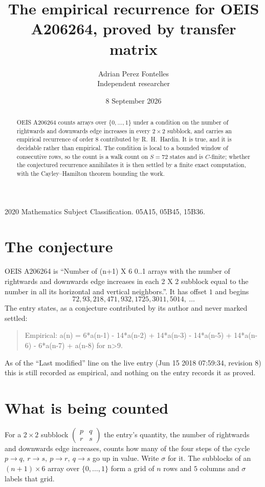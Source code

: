 \documentclass[11pt,a4paper]{article}
\title{The empirical recurrence for OEIS A206264, proved by transfer matrix}
\author{Adrian Perez Fontelles\\ \small Independent researcher}
\date{8 September 2026}
\theoremstyle{plain}
\theoremstyle{definition}
\begin{document}
\maketitle

\begin{abstract}
OEIS A206264 counts arrays over $\{0,\dots,1\}$ under a condition on the number of rightwards and downwards edge increases
in every $2\times2$ subblock, and carries an empirical recurrence of order $8$ contributed by
R.~H.~Hardin. It is true, and it is decidable rather than empirical. The condition is local to
a bounded window of consecutive rows, so the count is a walk count on $S=72$ states and is
$C$-finite; whether the conjectured recurrence annihilates it is then settled by a finite exact
computation, with the Cayley--Hamilton theorem bounding the work.
\end{abstract}

\noindent\small 2020 Mathematics Subject Classification. 05A15, 05B45, 15B36.\normalsize

\section{The conjecture}

OEIS A206264 is ``Number of (n+1) X 6 0..1 arrays with the number of rightwards and downwards edge increases in each 2 X 2 subblock equal to the number in all its horizontal and vertical neighbors.''. It has offset $1$ and begins
\[
72, 93, 218, 471, 932, 1725, 3011, 5014,\ \dots
\]
The entry states, as a conjecture contributed by its author and never marked settled:
\begin{quote}
Empirical: a(n) = 6*a(n-1) - 14*a(n-2) + 14*a(n-3) - 14*a(n-5) + 14*a(n-6) - 6*a(n-7) + a(n-8) for n>9.
\end{quote}
As of the ``Last modified'' line on the live entry (Jun 15 2018 07:59:34, revision 8) this is still
recorded as empirical, and nothing on the entry records it as proved.

\section{What is being counted}

For a $2\times2$ subblock $\begin{pmatrix}p&q\\r&s\end{pmatrix}$ the
entry's quantity, the number of rightwards and downwards edge increases, counts how many of the four steps of the cycle $p\to q,\ r\to s,\ p\to r,\ q\to s$ go up in value. Write $\sigma$ for it. The subblocks of an
$(n+1)\times6$ array over $\{0,\dots,1\}$ form a grid of $n$ rows and $5$
columns and $\sigma$ labels that grid.
\end{document}
